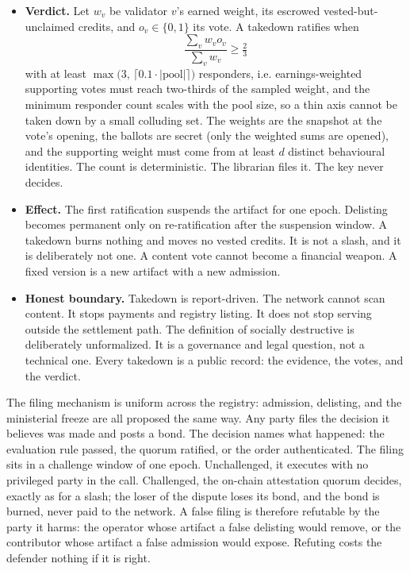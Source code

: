 \documentclass[11pt]{article}
\begin{document}
\begin{itemize}
          vested-but-unclaimed credits, per behavioural identity. A flood
          of fresh registrations carries no weight at all; it fails the
          pedigree gate. A vote cannot be bought on short notice, and
          weight cannot be banked long in advance; it dies with a
          claim.
    \item \textbf{Verdict.} Let $w_v$ be validator $v$'s earned
          weight, its escrowed vested-but-unclaimed credits, and
          $o_v \in \{0, 1\}$ its vote. A takedown ratifies when
          \begin{equation}
              \frac{\sum_v w_v o_v}{\sum_v w_v} \geq \tfrac{2}{3}
          \end{equation}
          with at least
          $\max\bigl(3,\, \lceil 0.1 \cdot |\text{pool}|\rceil\bigr)$
          responders, i.e. earnings-weighted
          supporting votes must reach two-thirds of the sampled weight,
          and the minimum responder count scales with the pool size, so a
          thin axis cannot be taken down by a small colluding set. The
          weights are the snapshot at the vote's
          opening, the ballots are secret (only the weighted sums are
          opened), and the supporting weight must come from at least $d$
          distinct behavioural identities. The count is deterministic. The
          librarian files it. The key never decides.
    \item \textbf{Effect.} The first ratification suspends the
          artifact for one epoch. Delisting becomes permanent only on
          re-ratification after the suspension window. A takedown
          burns nothing and moves no vested credits. It is not a slash, and
          it is deliberately not one. A content vote cannot become a
          financial weapon. A fixed version is a new artifact with a new
          admission.
    \item \textbf{Honest boundary.} Takedown is report-driven. The
          network cannot scan content. It stops payments and registry
          listing. It does not stop serving outside the settlement path.
          The definition of socially destructive is deliberately
          unformalized. It is a governance and legal question, not a
          technical one. Every takedown is a public record: the evidence,
          the votes, and the verdict.
\end{itemize}

The filing mechanism is uniform across the registry: admission,
delisting, and the ministerial freeze are all proposed the same
way. Any party files the decision it believes was made and posts a
bond. The decision names what happened: the evaluation rule
passed, the quorum ratified, or the order authenticated. The filing sits in a
challenge window of one epoch. Unchallenged, it executes with no
privileged party in the call. Challenged, the on-chain
attestation quorum decides, exactly as for a slash; the loser of
the dispute loses its bond, and the bond is
burned, never paid to the network. A false filing is therefore
refutable by the party it harms: the operator whose artifact a
false delisting would remove, or the contributor whose artifact a
false admission would expose. Refuting costs the defender
nothing if it is right.
\end{document}
